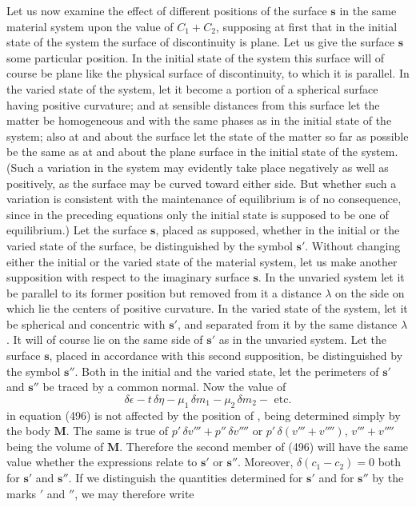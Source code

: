 \documentclass[12pt]{memoir}
\newcommand{\dd}{\delta}
\begin{document}
{Let us now examine the effect of different positions of the surface $\mathbf{s}$ in the same material system upon the value of $C_1 +C_2$, supposing at first that in the initial state of the system the surface of discontinuity is plane. Let us give the surface $\mathbf{s}$ some particular position. In the initial state of the system this surface will of course be plane like the physical surface of discontinuity, to which it is parallel. In the varied state of the system, let it become a portion of a spherical surface having positive curvature; and at sensible distances from this surface let the matter be homogeneous and with the same phases as in the initial state of the system; also at and about the surface let the state of the matter so far as possible be the same as at and about the plane surface in the initial state of the system. (Such a variation in the system may evidently take place negatively as well as positively, as the surface may be curved toward either side. But whether such a variation is consistent with the maintenance of equilibrium is of no consequence, since in the preceding equations only the initial state is supposed to be one of equilibrium.) Let the surface $\mathbf{s}$, placed as supposed, whether in the initial or the varied state of the surface, be distinguished by the symbol $\mathbf{s}'$. Without changing either the initial or the varied state of the material system, let us make another supposition with respect to the imaginary surface $\mathbf{s}$. In the unvaried system let it be parallel to its former position but removed from it a distance $\lambda$ on the side on which lie the centers of positive curvature. In the varied state of the system, let it be spherical and concentric with $\mathbf{s}'$, and separated from it by the same distance $\lambda$. It will of course lie on the same side of $\mathbf{s}'$ as in the unvaried system. Let the surface $\mathbf{s}$, placed in accordance with this second supposition, be distinguished by the symbol $\mathbf{s}''$. Both in the initial and the varied state, let the perimeters of $\mathbf{s}'$ and $\mathbf{s}''$ be traced by a common normal. Now the value of
$$ \dd \epsilon - t \, \dd \eta- \mu_1 \, \dd m_1 - \mu_2 \, \dd m_2 - \text{ etc.} $$
in equation (496) is not affected by the position of , being determined simply by the body $\mathbf{M}$. The same is true of $p'\, \dd v'''+p''\, \dd v''''$ or $p'\, \dd (v''' +v'''')$, $v'''+ v''''$ being the volume of $\mathbf{M}$. Therefore the second member of (496) will have the same value whether the expressions relate to $\mathbf{s}'$ or $\mathbf{s}''$.  Moreover, $\dd(c_1 -c_2)=0$ both for $\mathbf{s}'$ and $\mathbf{s}''$. If we distinguish the quantities determined for $\mathbf{s}'$ and for $\mathbf{s}''$ by the marks $'$ and $''$, we may therefore write
}
\end{document}
